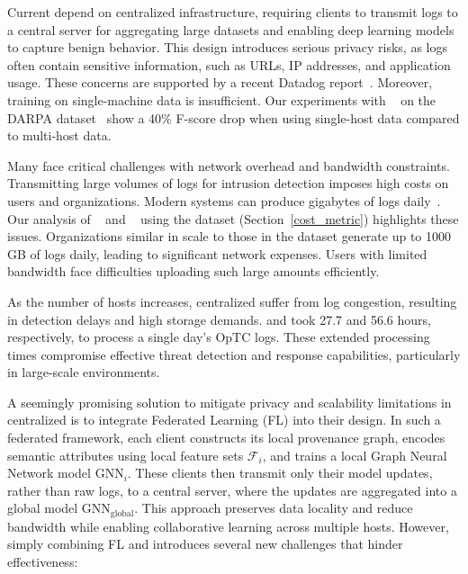  Current \pids depend on centralized infrastructure, requiring clients to transmit logs to a central server for aggregating large datasets and enabling deep learning models to capture benign behavior. This design introduces serious privacy risks, as logs often contain sensitive information, such as URLs, IP addresses, and application usage. These concerns are supported by a recent Datadog report~\cite{datadog}. Moreover, training on single-machine data is insufficient. Our experiments with \flash~\cite{flash2024} on the DARPA \optc dataset~\cite{darpaoptc} show a 40\% F-score drop when using single-host data compared to multi-host data.

Many \pids face critical challenges with network overhead and bandwidth constraints. Transmitting large volumes of logs for intrusion detection imposes high costs on users and organizations. Modern systems can produce gigabytes of logs daily~\cite{inam2023sok,hossain+depend}. Our analysis of \flash~\cite{flash2024} and \kairos~\cite{cheng2023kairos} using the \optc dataset (Section~\ref{cost_metric}) highlights these issues. Organizations similar in scale to those in the \optc dataset generate up to 1000 GB of logs daily, leading to significant network expenses. Users with limited bandwidth face difficulties uploading such large amounts efficiently.

As the number of hosts increases, centralized \pids suffer from log congestion, resulting in detection delays and high storage demands. \flash and \kairos took 27.7 and 56.6 hours, respectively, to process a single day's OpTC logs. These extended processing times compromise effective threat detection and response capabilities, particularly in large-scale environments.



\smallskip
{}
\smallskip

\noindent
A seemingly promising solution to mitigate privacy and scalability limitations in centralized \pids is to integrate Federated Learning (FL) into their design. In such a federated \pids framework, each client constructs its local provenance graph, encodes semantic attributes using local feature sets \( \mathcal{F}_i \), and trains a local Graph Neural Network model \( \text{GNN}_{i} \). These clients then transmit only their model updates, rather than raw logs, to a central server, where the updates are aggregated into a global model \( \text{GNN}_{\text{global}} \). This approach preserves data locality and reduce bandwidth while enabling collaborative learning across multiple hosts. However, simply combining FL and \pids introduces several new challenges that hinder effectiveness:

